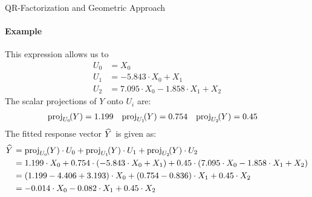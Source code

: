 \begin{frame}{QR-Factorization and Geometric Approach}
\framesubtitle{Example}
This expression allows us to
\begin{align*}
      U_0 & = X_0\\
      U_1 & = -5.843 \cdot X_0 + X_1\\
      U_2 & = 7.095 \cdot X_0 - 1.858 \cdot X_1 + X_2
\end{align*}
The scalar projections of $Y$ onto $U_i$ are:
\begin{align*}
   \operatorname{proj}_{U_0}\!(Y) & = 1.199 &
   \operatorname{proj}_{U_1}\!(Y) & = 0.754 &
   \operatorname{proj}_{U_2}\!(Y) & = 0.45 
\end{align*}
The fitted response vector $\mkern 1.5mu\widehat{\mkern-1.5muY}\mkern 1.5mu$ is given as:
\begin{align*}
    \mkern 1.5mu\widehat{\mkern-1.5muY}\mkern 1.5mu & = \operatorname{proj}_{U_0}\!(Y) \cdot U_0 + \operatorname{proj}_{U_1}\!(Y) \cdot U_1 + 
    \operatorname{proj}_{U_2}\!(Y) \cdot U_2\\
        & = 1.199 \cdot X_0 + 0.754 \cdot (-5.843 \cdot X_0 + X_1) +
        0.45\cdot (7.095 \cdot X_0 - 1.858 \cdot X_1 + X_2)\\
        & = (1.199 - 4.406 + 3.193) \cdot X_0 + (0.754 - 0.836) \cdot
        X_1 + 0.45
        \cdot X_2\\
        & = -0.014 \cdot X_0 -0.082 \cdot X_1 + 0.45 \cdot X_2
\end{align*}
\end{frame}
%
%
